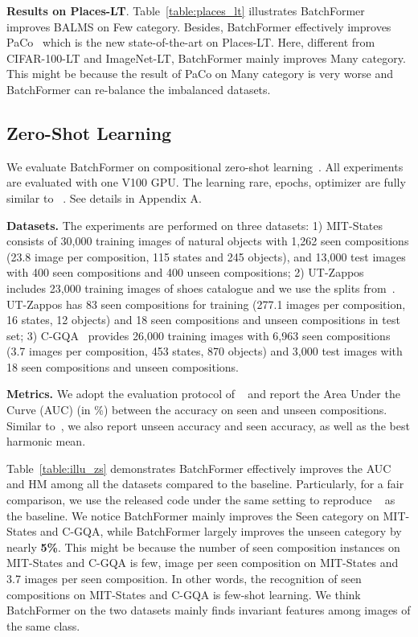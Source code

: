 \documentclass[10pt,twocolumn,letterpaper]{article}
\begin{document}
{\bf  Results on Places-LT}. Table~\ref{table:places_lt} illustrates BatchFormer improves BALMS on Few category. Besides, BatchFormer effectively improves PaCo~\cite{cui2021parametric} which is the new state-of-the-art on Places-LT. Here, different from CIFAR-100-LT and ImageNet-LT, BatchFormer mainly improves Many category. This might be because the result of PaCo on Many category is very worse and BatchFormer can re-balance the imbalanced datasets.

\subsection{Zero-Shot Learning}
We evaluate BatchFormer on compositional zero-shot learning~\cite{naeem2021learning}. All experiments are evaluated with one V100 GPU. The learning rare, epochs, optimizer are fully similar to ~\cite{naeem2021learning}. See details in Appendix A.

{\bf Datasets.} The experiments are performed on three datasets: 1) MIT-States~\cite{isola2015discovering} consists of 30,000 training images of natural objects with 1,262 seen compositions (23.8 image per composition, 115 states and 245 objects), and 13,000 test images with 400 seen compositions and 400 unseen compositions; 2) UT-Zappos~\cite{yu2014fine} includes 23,000 training images of shoes catalogue and we use the splits from~\cite{purushwalkam2019task}. UT-Zappos has 83 seen compositions for training (277.1 images per composition, 16 states, 12 objects) and 18 seen compositions and unseen compositions in test set; 3) C-GQA~\cite{naeem2021learning} provides 26,000 training images with 6,963 seen compositions (3.7 images per composition, 453 states, 870 objects) and 3,000 test images with 18 seen compositions and unseen compositions.

{\bf Metrics.} We adopt the evaluation protocol of ~\cite{purushwalkam2019task} and report the Area Under the Curve (AUC) (in \%) between the accuracy on seen and unseen compositions. Similar to~\cite{naeem2021learning}, we also report unseen accuracy and seen accuracy, as well as the best harmonic mean.

Table~\ref{table:illu_zs} demonstrates BatchFormer effectively improves the AUC and HM among all the datasets compared to the baseline. Particularly, for a fair comparison, we use the released code under the same setting to reproduce ~\cite{naeem2021learning} as the baseline. We notice BatchFormer mainly improves the Seen category on MIT-States and C-GQA, while BatchFormer largely improves the unseen category by nearly {\bf 5\%}. This might be because the number of seen composition instances on MIT-States and C-GQA is few,  image per seen composition on MIT-States and 3.7 images per seen composition. In other words, the recognition of seen compositions on MIT-States and C-GQA is few-shot learning. We think BatchFormer on the two datasets mainly finds invariant features among images of the same class.
\end{document}
